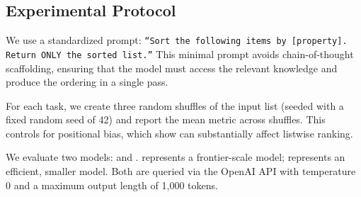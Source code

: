 \begin{table}[t]
    \centering
    \caption{Representative tasks from \benchname. Each task specifies a property and a list of 6--10 items with verified ground-truth orderings.}
    \label{tab:tasks}
\end{table}

\subsection{Experimental Protocol}
\label{sec:protocol}

We use a standardized prompt: \texttt{``Sort the following items by [property]. Return ONLY the sorted list.''}
This minimal prompt avoids chain-of-thought scaffolding, ensuring that the model must access the relevant knowledge and produce the ordering in a single pass.

For each task, we create three random shuffles of the input list (seeded with a fixed random seed of 42) and report the mean metric across shuffles.
This controls for positional bias, which \citet{tang2023found} show can substantially affect listwise ranking.

We evaluate two models: \gptlarge and \gptsmall.
\gptlarge represents a frontier-scale model; \gptsmall represents an efficient, smaller model.
Both are queried via the OpenAI API with temperature 0 and a maximum output length of 1{,}000 tokens.

